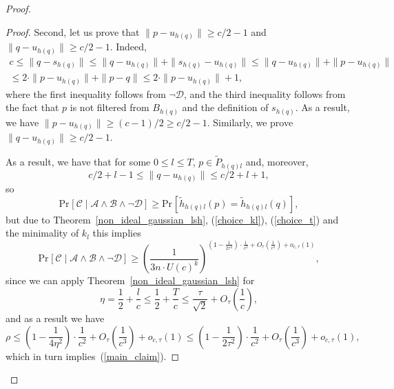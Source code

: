 \documentclass[11pt,letterpaper]{article}
\newcommand{\Prb}[2]{\mathrm{Pr}_{#1}\left[#2\right]}
\newcommand{\Ac}{\mathcal{A}}
\newcommand{\Bc}{\mathcal{B}}
\newcommand{\Cc}{\mathcal{C}}
\newcommand{\Dc}{\mathcal{D}}
\begin{document}
\begin{proof}
\begin{proof}
        Second, let us prove that $\|p - u_{h(q)}\| \geq c / 2 - 1$ and $\|q - u_{h(q)}\| \geq c/2 - 1$.
        Indeed, 
        \begin{multline*}
            c \leq \|q - s_{h(q)}\| \leq \|q - u_{h(q)}\| + \|s_{h(q)} - u_{h(q)}\|
            \leq \|q - u_{h(q)}\| + \|p - u_{h(q)}\| \\ \leq
            2 \cdot \|p - u_{h(q)}\| + \|p - q\| \leq 2 \cdot \|p - u_{h(q)}\| + 1,
        \end{multline*}
        where the first inequality follows from $\neg \Dc$, and the third inequality follows from the fact that $p$ is not filtered from $B_{h(q)}$ and the definition
        of $s_{h(q)}$.
        As a result, we have $\|p - u_{h(q)}\| \geq (c - 1) / 2 \geq c / 2 - 1$. Similarly, we prove
        $\|q - u_{h(q)}\| \geq c / 2 - 1$.

        As a result, we have that for some $0 \leq l \leq T$, $p \in \widetilde{P}_{h(q) l}$ and, moreover,
        $$
            c/2 + l - 1 \leq \|q - u_{h(q)}\| \leq c/2 + l + 1,
        $$
        so 
        $$
            \Prb{}{\Cc \mid \Ac \wedge \Bc \wedge \neg \Dc} \geq \Prb{}{\widetilde{h}_{h(q)l}(p) = \widetilde{h}_{h(q)l}(q)},
        $$
        but due to Theorem~\ref{non_ideal_gaussian_lsh}, (\ref{choice_kl}), (\ref{choice_t}) and the minimality of $k_l$ this implies
        \begin{equation}
            \label{main_claim}
            \Prb{}{\Cc \mid \Ac \wedge \Bc \wedge \neg \Dc} \geq \left(\frac{1}{3n \cdot U(c)^k}\right)^{\left(1 - \frac{1}{2\tau^2}\right)\cdot \frac{1}{c^2} + O_{\tau}\left(\frac{1}{c^3}\right) + o_{c, \tau}(1)},
        \end{equation}
        since we can apply Theorem~\ref{non_ideal_gaussian_lsh} for
        $$
            \eta = \frac{1}{2} + \frac{l}{c} \leq \frac{1}{2} + \frac{T}{c}
            \leq \frac{\tau}{\sqrt{2}} + O_{\tau}\left(\frac{1}{c}\right),
        $$
        and as a result we have
        $$
            \rho \leq \left(1 - \frac{1}{4 \eta^2}\right) \cdot \frac{1}{c^2} + O_{\tau}\left(\frac{1}{c^3}\right) + o_{c, \tau}(1)
            \leq \left(1 - \frac{1}{2 \tau^2}\right) \cdot \frac{1}{c^2} + O_{\tau}\left(\frac{1}{c^3}\right) + o_{c,\tau}(1),
        $$
        which in turn implies~(\ref{main_claim}).
    \end{proof}


\end{proof}
\end{document}
